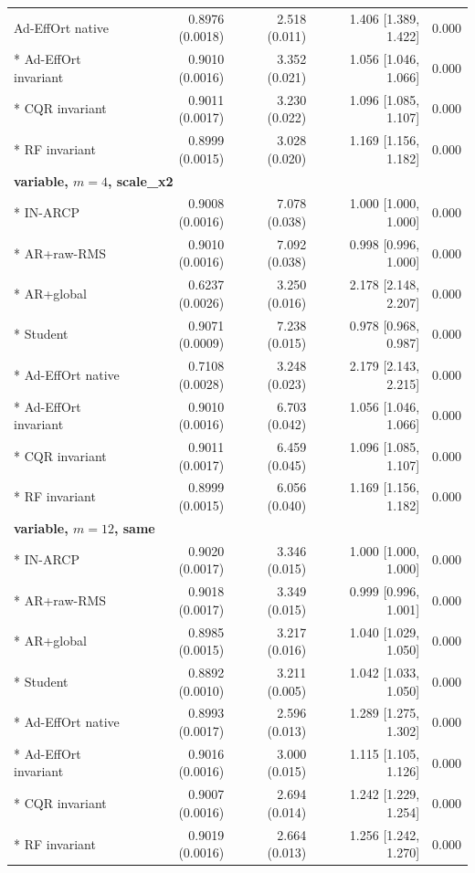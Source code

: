 \begin{longtable}{lrrrr}
Ad-EffOrt native & 0.8976 (0.0018) & 2.518 (0.011) & 1.406 [1.389, 1.422] & 0.000 \\*
Ad-EffOrt invariant & 0.9010 (0.0016) & 3.352 (0.021) & 1.056 [1.046, 1.066] & 0.000 \\*
CQR invariant & 0.9011 (0.0017) & 3.230 (0.022) & 1.096 [1.085, 1.107] & 0.000 \\*
RF invariant & 0.8999 (0.0015) & 3.028 (0.020) & 1.169 [1.156, 1.182] & 0.000 \\
\midrule
\multicolumn{5}{l}{\textbf{variable, $m=4$, scale\_x2}}\\*
IN-ARCP & 0.9008 (0.0016) & 7.078 (0.038) & 1.000 [1.000, 1.000] & 0.000 \\*
AR+raw-RMS & 0.9010 (0.0016) & 7.092 (0.038) & 0.998 [0.996, 1.000] & 0.000 \\*
AR+global & 0.6237 (0.0026) & 3.250 (0.016) & 2.178 [2.148, 2.207] & 0.000 \\*
Student & 0.9071 (0.0009) & 7.238 (0.015) & 0.978 [0.968, 0.987] & 0.000 \\*
Ad-EffOrt native & 0.7108 (0.0028) & 3.248 (0.023) & 2.179 [2.143, 2.215] & 0.000 \\*
Ad-EffOrt invariant & 0.9010 (0.0016) & 6.703 (0.042) & 1.056 [1.046, 1.066] & 0.000 \\*
CQR invariant & 0.9011 (0.0017) & 6.459 (0.045) & 1.096 [1.085, 1.107] & 0.000 \\*
RF invariant & 0.8999 (0.0015) & 6.056 (0.040) & 1.169 [1.156, 1.182] & 0.000 \\
\midrule
\multicolumn{5}{l}{\textbf{variable, $m=12$, same}}\\*
IN-ARCP & 0.9020 (0.0017) & 3.346 (0.015) & 1.000 [1.000, 1.000] & 0.000 \\*
AR+raw-RMS & 0.9018 (0.0017) & 3.349 (0.015) & 0.999 [0.996, 1.001] & 0.000 \\*
AR+global & 0.8985 (0.0015) & 3.217 (0.016) & 1.040 [1.029, 1.050] & 0.000 \\*
Student & 0.8892 (0.0010) & 3.211 (0.005) & 1.042 [1.033, 1.050] & 0.000 \\*
Ad-EffOrt native & 0.8993 (0.0017) & 2.596 (0.013) & 1.289 [1.275, 1.302] & 0.000 \\*
Ad-EffOrt invariant & 0.9016 (0.0016) & 3.000 (0.015) & 1.115 [1.105, 1.126] & 0.000 \\*
CQR invariant & 0.9007 (0.0016) & 2.694 (0.014) & 1.242 [1.229, 1.254] & 0.000 \\*
RF invariant & 0.9019 (0.0016) & 2.664 (0.013) & 1.256 [1.242, 1.270] & 0.000 \\

\end{longtable}
